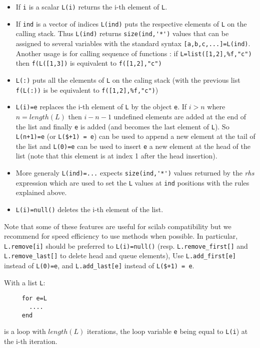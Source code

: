 \begin{itemize}
   \item If \verb+i+ is a scalar \verb+L(i)+ returns the i-th element of \verb+L+.
   \item If \verb+ind+ is a vector of indices \verb+L(ind)+ 
     puts the respective elements of \verb+L+ on the 
     calling stack. Thus \verb+L(ind)+ returns \verb+size(ind,'*')+ values that 
     can be assigned to several variables with the standard syntax \verb+[a,b,c,...]=L(ind)+. 
     Another usage is for calling sequence of functions : if \verb+L=list([1,2],%f,"c")+
     then  \verb+f(L([1,3])+ is equivalent to  \verb+f([1,2],"c")+
   \item \verb+L(:)+ puts all the elements of \verb+L+ on the caling stack
     (with the previous list  \verb+f(L(:))+ is be equivalent to \verb+f([1,2],%f,"c")+)
   \item \verb+L(i)=e+ replaces the i-th element of \verb+L+ by
     the object \verb+e+. If $i > n$ where $n=length(L)$ then $i-n-1$ undefined
     elements are added at the end of the list and finally \verb+e+
     is added (and becomes the last element of \verb+L+). 
     So \verb-L(n+1)=e- (or \verb-L($+1) = e-) can be used to append a new element at the tail of the list 
     and \verb+L(0)=e+ can be used to insert \verb+e+ a new element at the head of the list 
     (note that this element is at index 1 after the head insertion).
   \item More generaly \verb+L(ind)=...+ expects \verb+size(ind,'*')+ values returned 
     by the {\em rhs} expression which are used to set the \verb+L+ values at \verb+ind+ positions with 
     the rules explained above. 
   \item \verb+L(i)=null()+ deletes the i-th element of the list.
\end{itemize}

Note that some of these features are useful for scilab compatibility
but we recommend for speed efficiency to use methods when possible.
In particular, \verb+L.remove[i]+ should be preferred to \verb+L(i)=null()+ 
(resp. \verb+L.remove_first[]+ and \verb+L.remove_last[]+ to delete head and queue elements),
Use \verb+L.add_first[e]+ instead of \verb+L(0)=e+, and \verb+L.add_last[e]+ instead of 
\verb-L($+1) = e-.

With a list \verb+L+:\begin{verbatim}
     for e=L
       ....
     end
\end{verbatim} 
is a loop with $length(L)$ iterations, the loop 
variable  \verb+e+ being equal to \verb+L(i+) at the i-th iteration.

